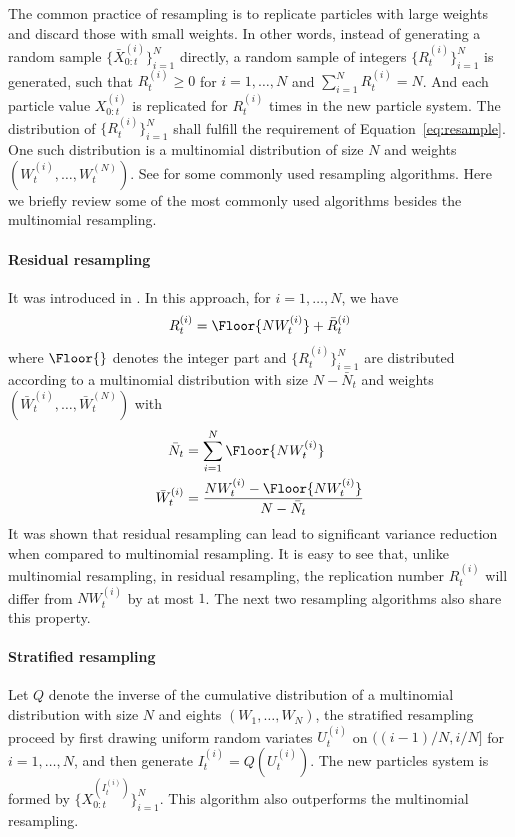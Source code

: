 The common practice of resampling is to replicate particles with large weights
and discard those with small weights. In other words, instead of generating a
random sample $\{\bar{X}_{0:t}^{(i)}\}_{i=1}^N$ directly, a random sample of
integers $\{R_t^{(i)}\}_{i=1}^N$ is generated, such that $R_t^{(i)} \ge 0$ for
$i = 1,\dots,N$ and $\sum_{i=1}^N R_t^{(i)} = N$. And each particle value
$X_{0:t}^{(i)}$ is replicated for $R_t^{(i)}$ times in the new particle
system. The distribution of $\{R_t^{(i)}\}_{i=1}^N$ shall fulfill the
requirement of Equation~\ref{eq:resample}. One such distribution is a
multinomial distribution of size $N$ and weights
$(W_t^{(i)},\dots,W_t^{(N)})$. See \cite{Douc:2005wa} for some commonly used
resampling algorithms. Here we briefly review some of the most commonly used
algorithms besides the multinomial resampling.

\paragraph{Residual resampling} It was introduced in \cite{Liu:1998iu}. In
this approach, for $i = 1,\dots,N$, we have
\begin{equation}
  R_t^{(i)} = \Floor{NW_t^{(i)}} + \bar{R}_t^{(i)}
\end{equation}
where $\Floor{}$ denotes the integer part and $\{R_t^{(i)}\}_{i=1}^N$ are
distributed according to a multinomial distribution with size $N - \bar{N}_t$
and weights $(\bar{W}_t^{(i)},\dots,\bar{W}_t^{(N)})$ with
\begin{align*}
  \bar{N}_t &= \sum_{i=1}^N\Floor{NW_t^{(i)}} \\
  \bar{W}_t^{(i)} &= \frac{NW_t^{(i)} - \Floor{NW_t^{(i)}}}{N - \bar{N}_t}
\end{align*}
It was shown that residual resampling can lead to significant variance
reduction when compared to multinomial resampling. It is easy to see that,
unlike multinomial resampling, in residual resampling, the replication number
$R_t^{(i)}$ will differ from $NW_t^{(i)}$ by at most $1$. The next two
resampling algorithms also share this property.

\paragraph{Stratified resampling} Let $Q$ denote the inverse of the cumulative
distribution of a multinomial distribution with size $N$ and eights
$(W_1,\dots,W_N)$, the stratified resampling proceed by first drawing uniform
random variates $U_t^{(i)}$ on $((i-1)/N, i/N]$ for $i = 1,\dots,N$, and then
generate $I_t^{(i)} = Q(U_t^{(i)})$. The new particles system is formed by
$\{X_{0:t}^{(I_t^{(i)})}\}_{i=1}^N$. This algorithm also outperforms the
multinomial resampling.

